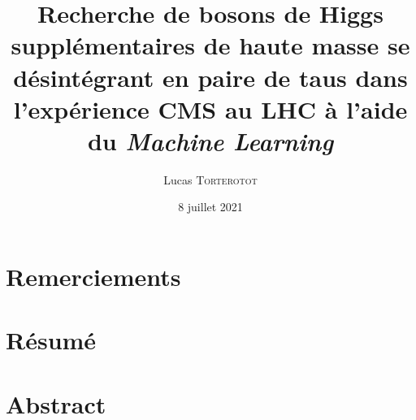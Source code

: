 \RequirePackage[log-declarations=false]{xparse}
\usepackage[none,nabla,seccolor,ppl,nosorting,minitoc]{ltstyle}
\usepackage{cmstransversetikz}



\def\insertlabo{Institut de Physique des 2 Infinis de Lyon}
\def\insertshortlabo{IP2I}

\title{Recherche de bosons de Higgs supplémentaires de haute masse se désintégrant en paire de taus dans l'expérience CMS au LHC à l'aide du \emph{Machine Learning}}
\author[L. \textsc{Torterotot}]{Lucas \textsc{Torterotot}}
\date{8 juillet 2021}
\imgcover{}
\editionsettings{}
\publisher{}


\pagestyle{empty}

\cleardoublepage
\pagestyle{empty}

\cleardoublepage
\chapter*{Remerciements}\thispagestyle{empty}\pagestyle{empty}

\cleardoublepage
\chapter*{Résumé}\thispagestyle{empty}\pagestyle{empty}

\chapter*{Abstract}\thispagestyle{empty}\pagestyle{empty}

\cleardoublepage
\frontmatter
\tableofcontents
\listoffigures
\listoftables
\mainmatter



\appendix\def\minitoc{}

\backmatter
\printbibliographyREF

